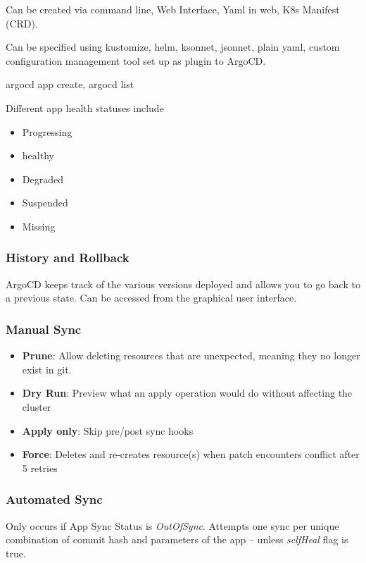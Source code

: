 Can be created via command line, Web Interface, Yaml in web, K8s Manifest (CRD).

Can be specified using kustomize, helm, ksonnet, jsonnet, plain yaml, custom configuration management tool set up as plugin to ArgoCD.

\vspace{3mm}
\ttfamily argocd app create, argocd list 
\rmfamily

\vspace{3mm}
\noindent
Different app health statuses include 
\begin{itemize}
    \item Progressing
    \item healthy
    \item Degraded
    \item Suspended
    \item Missing
\end{itemize}

\subsubsection{History and Rollback}
ArgoCD keeps track of the various versions deployed and allows you to go back to a previous state.
Can be accessed from the graphical user interface.

\subsubsection{Manual Sync}
\begin{itemize}
    \item \textbf{Prune}: Allow deleting resources that are unexpected, meaning they no longer exist in git.
    \item \textbf{Dry Run}: Preview what an apply operation would do without affecting the cluster
    \item \textbf{Apply only}: Skip pre/post sync hooks
    \item \textbf{Force}: Deletes and re-creates resource(s) when patch encounters conflict after 5 retries 
\end{itemize}

\subsubsection{Automated Sync}
Only occurs if App Sync Status is \emph{OutOfSync}. Attempts one sync per unique combination of commit hash and parameters of the app -- unless \emph{selfHeal} flag is true.

